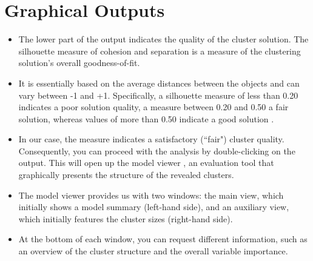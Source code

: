 \documentclass[a4paper,12pt]{article}
\begin{document}
\section{Graphical Outputs}
\begin{itemize}
    \item 
The lower part of the output  indicates the quality of the cluster
solution. The silhouette measure of cohesion and separation is a measure of the
clustering solution’s overall goodness-of-fit. 
\item It is essentially based on the average
distances between the objects and can vary between -1 and +1. Specifically, a
silhouette measure of less than 0.20 indicates a poor solution quality, a measure
between 0.20 and 0.50 a fair solution, whereas values of more than 0.50 indicate a
good solution . 
\item In our case, the measure indicates a satisfactory (``fair") cluster quality. Consequently, you can
proceed with the analysis by double-clicking on the output. This will open up the
model viewer , an evaluation tool that graphically presents the structure
of the revealed clusters.
\item 

The model viewer provides us with two windows: the main view, which initially
shows a model summary (left-hand side), and an auxiliary view, which initially
features the cluster sizes (right-hand side).
\item At the bottom of each window, you can
request different information, such as an overview of the cluster structure and the
overall variable importance.
\end{itemize}


\newpage
\end{document}
